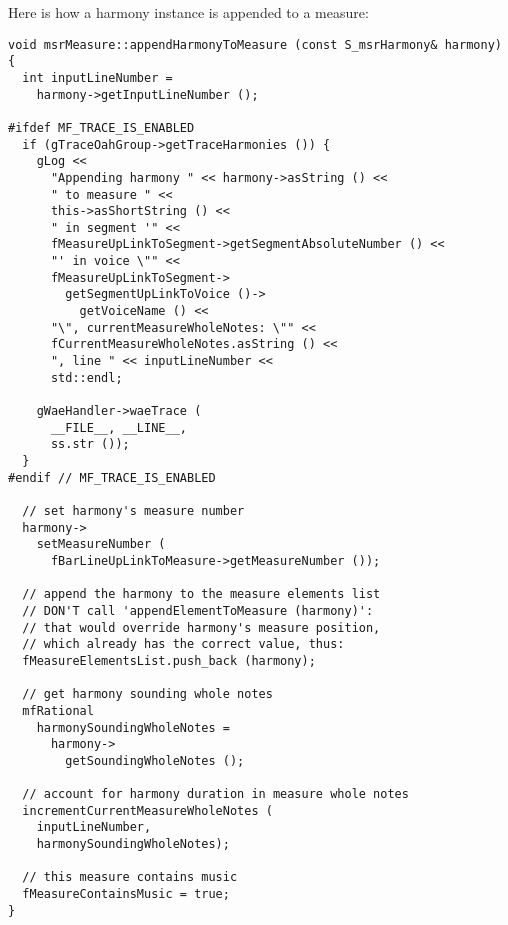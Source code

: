Here is how a harmony instance is appended to a measure:
\begin{lstlisting}[language=CPlusPlus]
void msrMeasure::appendHarmonyToMeasure (const S_msrHarmony& harmony)
{
  int inputLineNumber =
    harmony->getInputLineNumber ();

#ifdef MF_TRACE_IS_ENABLED
  if (gTraceOahGroup->getTraceHarmonies ()) {
    gLog <<
      "Appending harmony " << harmony->asString () <<
      " to measure " <<
      this->asShortString () <<
      " in segment '" <<
      fMeasureUpLinkToSegment->getSegmentAbsoluteNumber () <<
      "' in voice \"" <<
      fMeasureUpLinkToSegment->
        getSegmentUpLinkToVoice ()->
          getVoiceName () <<
      "\", currentMeasureWholeNotes: \"" <<
      fCurrentMeasureWholeNotes.asString () <<
      ", line " << inputLineNumber <<
      std::endl;

    gWaeHandler->waeTrace (
      __FILE__, __LINE__,
      ss.str ());
  }
#endif // MF_TRACE_IS_ENABLED

  // set harmony's measure number
  harmony->
    setMeasureNumber (
      fBarLineUpLinkToMeasure->getMeasureNumber ());

  // append the harmony to the measure elements list
  // DON'T call 'appendElementToMeasure (harmony)':
  // that would override harmony's measure position,
  // which already has the correct value, thus:
  fMeasureElementsList.push_back (harmony);

  // get harmony sounding whole notes
  mfRational
    harmonySoundingWholeNotes =
      harmony->
        getSoundingWholeNotes ();

  // account for harmony duration in measure whole notes
  incrementCurrentMeasureWholeNotes (
    inputLineNumber,
    harmonySoundingWholeNotes);

  // this measure contains music
  fMeasureContainsMusic = true;
}
\end{lstlisting}

